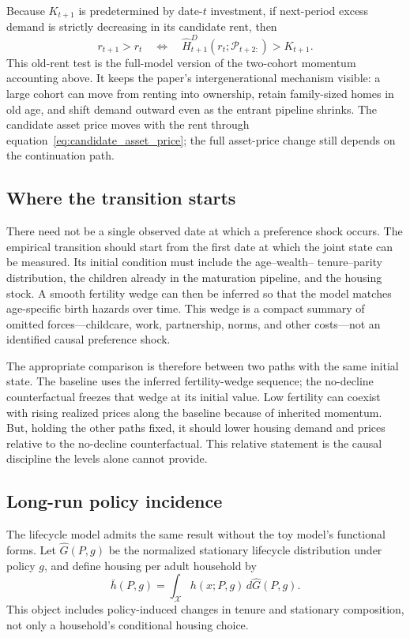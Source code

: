 \documentclass[11pt]{article}
\theoremstyle{definition}
\newcommand{\1}{\mathbf 1}
\newcommand{\X}{\mathcal X}
\begin{document}
Because $K_{t+1}$ is predetermined by date-$t$ investment, if next-period
excess demand is strictly decreasing in its candidate rent, then
\begin{equation}
 r_{t+1}>r_t
 \quad\Longleftrightarrow\quad
 \widehat H^D_{t+1}(r_t;\mathcal P_{t+2:})>K_{t+1}.
 \label{eq:old_rent_price_test}
\end{equation}
This old-rent test is the full-model version of the two-cohort momentum
accounting above. It keeps the paper's
intergenerational mechanism visible: a large cohort can move from renting into
ownership, retain family-sized homes in old age, and shift demand outward even
as the entrant pipeline shrinks. The candidate asset price moves with the rent
through equation~\eqref{eq:candidate_asset_price}; the full asset-price change
still depends on the continuation path.

\subsection{Where the transition starts}

There need not be a single observed date at which a preference shock occurs.
The empirical transition should start from the first date at which the joint
state can be measured. Its initial condition must include the age--wealth--
tenure--parity distribution, the children already in the maturation pipeline,
and the housing stock. A smooth fertility wedge can then be inferred so that
the model matches age-specific birth hazards over time. This wedge is a compact
summary of omitted forces---childcare, work, partnership, norms, and other
costs---not an identified causal preference shock.

The appropriate comparison is therefore between two paths with the same
initial state. The baseline uses the inferred fertility-wedge sequence; the
no-decline counterfactual freezes that wedge at its initial value. Low
fertility can coexist with rising realized prices along the baseline because
of inherited momentum. But, holding the other paths fixed, it should lower
housing demand and prices relative to the no-decline counterfactual. This
relative statement is the causal discipline the levels alone cannot provide.

\subsection{Long-run policy incidence}

The lifecycle model admits the same result without the toy model's functional
forms. Let $\widehat G(P,g)$ be the normalized stationary lifecycle
distribution under policy $g$, and define housing per adult household by
\begin{equation}
 \bar h(P,g)=\int_{\X}h(x;P,g)\,d\widehat G(P,g).
 \label{eq:average_stationary_housing}
\end{equation}
This object includes policy-induced changes in tenure and stationary
composition, not only a household's conditional housing choice.
\end{document}
